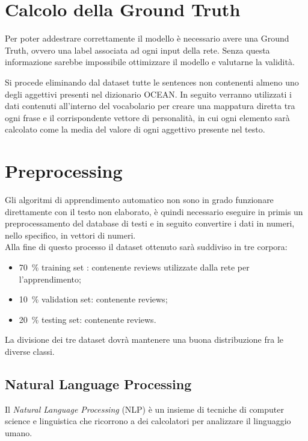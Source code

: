 \section{Calcolo della Ground Truth}
\label{sec:GroundTruth}

Per poter addestrare correttamente il modello è necessario avere una Ground Truth, ovvero una label associata ad ogni input della rete. Senza questa informazione sarebbe impossibile ottimizzare il modello e valutarne la validità. 

Si procede eliminando dal dataset tutte le sentences non contenenti almeno uno degli aggettivi presenti nel dizionario OCEAN. In seguito verranno utilizzati i dati contenuti all'interno del vocabolario per creare una mappatura diretta tra ogni frase e il corrispondente vettore di personalità, in cui ogni elemento sarà calcolato come la media del valore di ogni aggettivo presente nel testo.

\section{Preprocessing}
\label{sec:preprocessing}
Gli algoritmi di apprendimento automatico non sono in grado funzionare direttamente con il testo non elaborato, è quindi necessario eseguire in primis un preprocessamento del database di testi e in seguito convertire i dati in numeri, nello specifico, in vettori di numeri.\\
Alla fine di questo processo il dataset ottenuto sarà suddiviso in tre corpora: 
\begin{itemize}
	\item \SI{70}{\percent} training set : contenente  reviews utilizzate dalla rete per l'apprendimento;
	\item \SI{10}{\percent} validation set: contenente  reviews;
	\item \SI{20}{\percent} testing set: contenente  reviews.
\end{itemize}
La divisione dei tre dataset dovrà mantenere una buona distribuzione fra le diverse classi.

\subsection{Natural Language Processing}
\label{subsec:nlp}
Il \emph{Natural Language Processing} (NLP) è un insieme di tecniche di computer science e linguistica che ricorrono a dei calcolatori per analizzare il linguaggio umano.
\\

